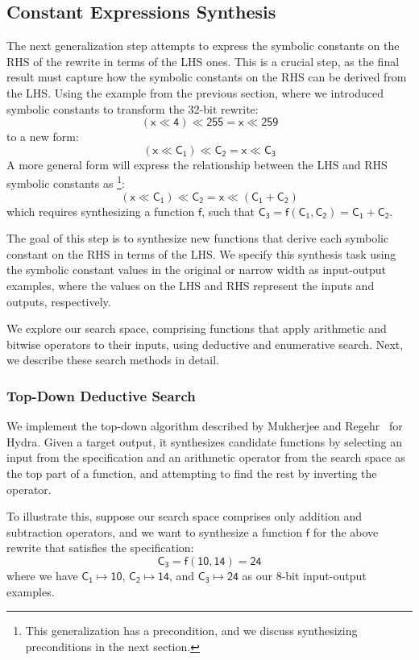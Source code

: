 \documentclass[review, anonymous, acmsmall]{acmart}
\newcommand{\blockmath}[1]{\[\mathsf{#1}\]}
\newcommand{\inline}[1]{$\mathsf{#1}$}
\begin{document}
\subsection{Constant Expressions Synthesis}
\label{sec:search}
The next generalization step attempts to express the symbolic constants on the RHS of the rewrite in terms of the LHS ones. This is a crucial step, as the final result must capture how the symbolic constants on the RHS can be derived from the LHS. 
Using the example from the previous section, where we introduced symbolic constants to transform the 32-bit rewrite:
    \blockmath{(x \ll 4) \ll 255 = x \ll 259}
to a new form:
    \blockmath{(x \ll C_1) \ll C_2 = x \ll C_3}
A more general form will express the relationship between the LHS and RHS symbolic constants as \footnote{This generalization has a precondition, and we discuss synthesizing preconditions in the next section.}:
     \blockmath{(x \ll C_1) \ll C_2 = x \ll (C_1 + C_2)}
which requires synthesizing a function \inline{f}, such that \inline{C_3 = f(C_1, C_2) = C_1 + C_2}. 


The goal of this step is to synthesize new functions that derive each symbolic constant on the RHS in terms of the LHS. We specify this synthesis task using the symbolic constant values in the original or narrow width as input-output examples, where the values on the LHS and RHS represent the inputs and outputs, respectively.  

We explore our search space, comprising functions that apply arithmetic and bitwise operators to their inputs, using deductive and enumerative search. Next, we describe these search methods in detail.   



\subsubsection{Top-Down Deductive Search}

We implement the top-down algorithm described by Mukherjee and Regehr~\cite{mukherjee_hydra_2024} for Hydra. Given a target output, it synthesizes candidate functions by selecting an input from the specification and an arithmetic operator from the search space as the top part of a function, and attempting to find the rest by inverting the operator.  

To illustrate this, suppose our search space comprises only addition and subtraction operators, and we want to synthesize a function \inline{f} for the above rewrite that satisfies the specification: 
\blockmath{C_3 = f(10, 14) = 24}
where we have \inline{C_1 \mapsto 10}, \inline{C_2 \mapsto 14}, and \inline{C_3 \mapsto 24} as our 8-bit input-output examples.
\end{document}
